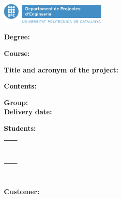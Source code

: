
\thispagestyle{CoverPage}

\includegraphics[width=0.4\textwidth]{./doc_config/images/UPC_ProjectesEng1.png}

\hspace{30pt} {\scriptsize \textbf{\Seccio}}

\vspace{20pt}

\textbf{Degree:} \Degree

\textbf{Course:} \Course

\vspace{50pt}

\textbf{Title and acronym of the project:}

\hspace{10pt} \ProjectName

\hspace{10pt} \Acronym

\vspace{40pt}

\textbf{Contents:} \DocType

\vspace{20pt}

\textbf{Group:} \GrCode\\

\textbf{Delivery date:} \DocDate\\

\vspace{20pt}

\textbf{Students:}\vspace{7pt}

\begin{tabular}{ll}
	\Studi    \hspace*{30pt} & \Studii   \\
	\Studiii  \hspace*{30pt} & \Studiv   \\
	\Studv    \hspace*{30pt} & \Studvi   \\
	\Studvii  \hspace*{30pt} & \Studviii \\
	\Studix   \hspace*{30pt} & \Studx    \\
	\Studxi   \hspace*{30pt} & \Studxii  \\
	\Studxiii \hspace*{30pt} & \Studxiv  \\
	\Studxv   \hspace*{30pt} & \Studxvi  \\
	\Studxvii  \\
	
\end{tabular}\\

\vspace{15pt}

\textbf{Customer:} \Customer